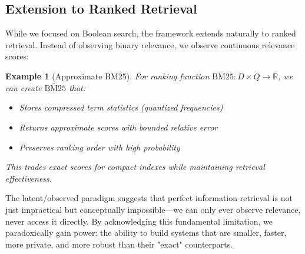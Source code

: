 \documentclass[11pt,final,hidelinks]{article}
\newtheorem{example}[theorem]{Example}
\newcommand{\obs}[1]{\widetilde{#1}}  %
\begin{document}
\subsection{Extension to Ranked Retrieval}

While we focused on Boolean search, the framework extends naturally to ranked retrieval. Instead of observing binary relevance, we observe continuous relevance scores:

\begin{example}[Approximate BM25]
For ranking function $\text{BM25}: D \times Q \to \mathbb{R}$, we can create $\obs{\text{BM25}}$ that:
\begin{itemize}
    \item Stores compressed term statistics (quantized frequencies)
    \item Returns approximate scores with bounded relative error
    \item Preserves ranking order with high probability
\end{itemize}
This trades exact scores for compact indexes while maintaining retrieval effectiveness.
\end{example}

The latent/observed paradigm suggests that perfect information retrieval is not just impractical but conceptually impossible—we can only ever observe relevance, never access it directly. By acknowledging this fundamental limitation, we paradoxically gain power: the ability to build systems that are smaller, faster, more private, and more robust than their "exact" counterparts.


\end{document}

